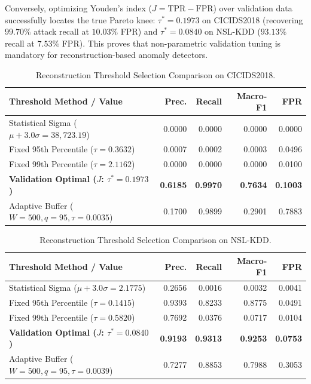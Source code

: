 \documentclass[journal]{IEEEtran}
\begin{document}
Conversely, optimizing Youden's index ($J = \text{TPR} - \text{FPR}$) over validation data successfully locates the true Pareto knee: $\tau^* = 0.1973$ on CICIDS2018 (recovering $99.70\%$ attack recall at $10.03\%$ FPR) and $\tau^* = 0.0840$ on NSL-KDD ($93.13\%$ recall at $7.53\%$ FPR). This proves that non-parametric validation tuning is mandatory for reconstruction-based anomaly detectors.

\begin{table}[!t]
\centering
\caption{Reconstruction Threshold Selection Comparison on CICIDS2018.}
\label{tab:threshold_cicids}
\footnotesize
\setlength{\tabcolsep}{2.5pt}
\begin{tabularx}{\columnwidth}{Y r r r r}
\toprule
\textbf{Threshold Method / Value} & \textbf{Prec.} & \textbf{Recall} & \textbf{Macro-F1} & \textbf{FPR}\\
\midrule
Statistical Sigma ($\mu + 3.0\sigma = 38{,}723.19$) & 0.0000 & 0.0000 & 0.0000 & 0.0000\\
Fixed 95th Percentile ($\tau = 0.3632$) & 0.0007 & 0.0002 & 0.0003 & 0.0496\\
Fixed 99th Percentile ($\tau = 2.1162$) & 0.0000 & 0.0000 & 0.0000 & 0.0100\\
\textbf{Validation Optimal ($J$: $\tau^* = 0.1973$)} & \textbf{0.6185} & \textbf{0.9970} & \textbf{0.7634} & \textbf{0.1003}\\
Adaptive Buffer ($W=500, q=95, \tau=0.0035$) & 0.1700 & 0.9899 & 0.2901 & 0.7883\\
\bottomrule
\end{tabularx}
\end{table}

\begin{table}[!t]
\centering
\caption{Reconstruction Threshold Selection Comparison on NSL-KDD.}
\label{tab:threshold_nslkdd}
\footnotesize
\setlength{\tabcolsep}{2.5pt}
\begin{tabularx}{\columnwidth}{Y r r r r}
\toprule
\textbf{Threshold Method / Value} & \textbf{Prec.} & \textbf{Recall} & \textbf{Macro-F1} & \textbf{FPR}\\
\midrule
Statistical Sigma ($\mu + 3.0\sigma = 2.1775$) & 0.2656 & 0.0016 & 0.0032 & 0.0041\\
Fixed 95th Percentile ($\tau = 0.1415$) & 0.9393 & 0.8233 & 0.8775 & 0.0491\\
Fixed 99th Percentile ($\tau = 0.5820$) & 0.7692 & 0.0376 & 0.0717 & 0.0104\\
\textbf{Validation Optimal ($J$: $\tau^* = 0.0840$)} & \textbf{0.9193} & \textbf{0.9313} & \textbf{0.9253} & \textbf{0.0753}\\
Adaptive Buffer ($W=500, q=95, \tau=0.0039$) & 0.7277 & 0.8853 & 0.7988 & 0.3053\\
\bottomrule
\end{tabularx}
\end{table}
\end{document}
